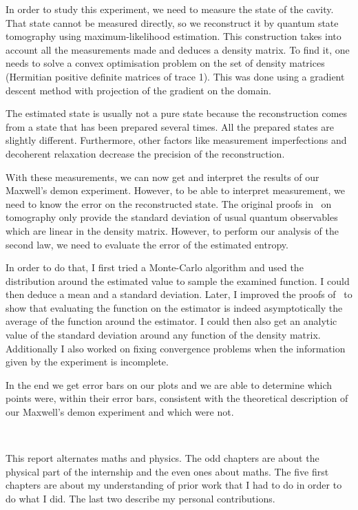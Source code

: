 \documentclass[10pt,a4paper]{report}
\theoremstyle{plain}
\theoremstyle{definition}
\theoremstyle{remark}
\begin{document}
In order to study this experiment, we need to measure the state of the cavity.
That state cannot be measured directly, so we reconstruct it by quantum state tomography using
maximum-likelihood estimation. This construction takes into account all the
measurements made and deduces a density matrix. To find it, one needs to solve a
convex optimisation problem on the set of density matrices (Hermitian positive
definite matrices of trace 1). This was done using a gradient descent method with
projection of the gradient on the domain.

The estimated state is usually not a pure state because the reconstruction
comes from a state that has been prepared several times.
All the prepared states are slightly different.
Furthermore, other factors like measurement imperfections and decoherent
relaxation decrease the precision of the reconstruction.

With these measurements, we can now get and interpret the results of our Maxwell's
demon experiment. However, to be able to interpret measurement, we need to know
the error on the reconstructed state. The original proofs in~\cite{SPRAL17} on
tomography only provide the standard deviation of usual quantum observables which
are linear in the density matrix. However, to perform our analysis of the second law,
we need to evaluate the error of the estimated entropy.

In order to do that, I first tried a Monte-Carlo algorithm and used the
distribution around the estimated value to sample the examined function. I could
then deduce a mean and a standard deviation. Later, I improved the proofs
of~\cite{SPRAL17} to show that evaluating the function on the estimator is
indeed asymptotically the average of the function around the estimator. I could
then also get an analytic value of the standard deviation around any
function of the density matrix. Additionally I also worked on fixing convergence
problems when the information given by the experiment is incomplete.

In the end we get error bars on our plots and we are able to determine which
points were, within their error bars, consistent with the theoretical description
of our Maxwell's demon experiment and which were not.

\

This report alternates maths and physics. The odd chapters are about the physical
part of the internship and the even ones about maths. The five first chapters are
about my understanding of prior work that I had to do in order to do what I did.
The last two describe my personal contributions.
\end{document}
